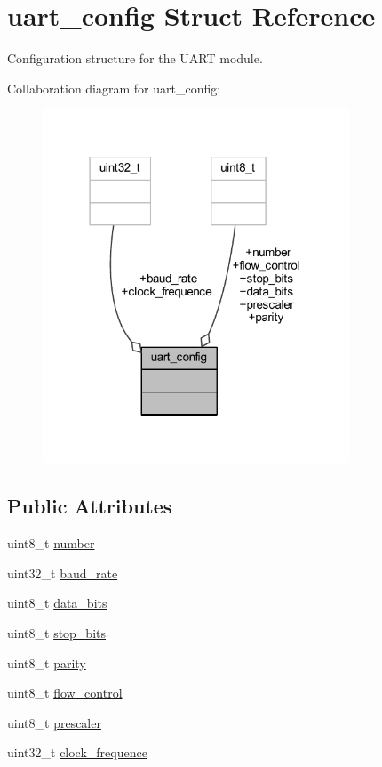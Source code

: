 \hypertarget{structuart__config}{}\section{uart\+\_\+config Struct Reference}
\label{structuart__config}


Configuration structure for the U\+A\+RT module.  




Collaboration diagram for uart\+\_\+config\+:
\nopagebreak
\begin{figure}[H]
\begin{center}
\leavevmode
\includegraphics[width=259pt]{structuart__config__coll__graph}
\end{center}
\end{figure}
\subsection*{Public Attributes}
\begin{DoxyCompactItemize}
\item 
uint8\+\_\+t \hyperlink{structuart__config_a9f1c46bb7135a0a5dc0bce4f9982dc5f}{number}
\item 
uint32\+\_\+t \hyperlink{structuart__config_a3002fe5cb1c359f93dddb9198356bdcc}{baud\+\_\+rate}
\item 
uint8\+\_\+t \hyperlink{structuart__config_a93ee24cf6669fb4cfece78a53d3ec6c5}{data\+\_\+bits}
\item 
uint8\+\_\+t \hyperlink{structuart__config_a7b98cd63c531110dc3dc99e94db73642}{stop\+\_\+bits}
\item 
uint8\+\_\+t \hyperlink{structuart__config_a9371728729252797880de052aae01089}{parity}
\item 
uint8\+\_\+t \hyperlink{structuart__config_a30a786254694bfca26d7985545b6ffc6}{flow\+\_\+control}
\item 
uint8\+\_\+t \hyperlink{structuart__config_a9fb83c1cf1226b2dc4371bb79699dd71}{prescaler}
\item 
uint32\+\_\+t \hyperlink{structuart__config_a07d92658a8aea18961c39878c11fa689}{clock\+\_\+frequence}
\end{DoxyCompactItemize}


